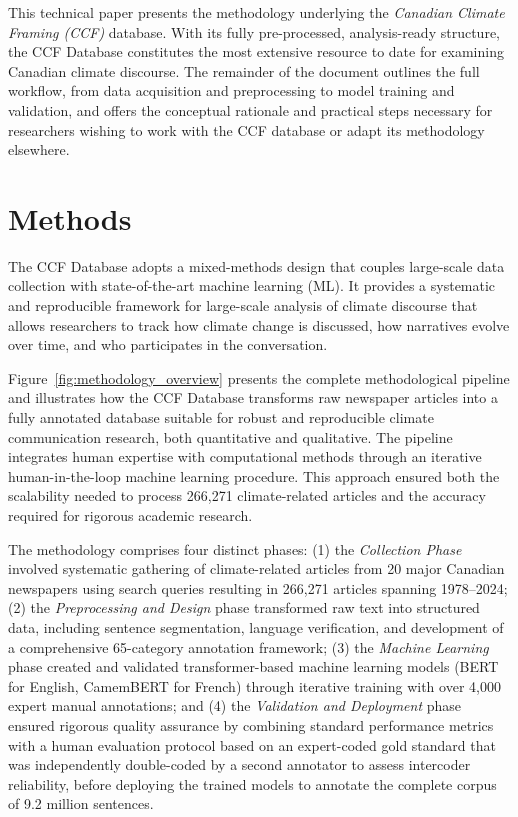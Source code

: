 \documentclass[12pt]{article}
\renewcommand\_{\texttt{\detokenize{_}\allowbreak}}
\begin{document}
This technical paper presents the methodology underlying the \emph{Canadian Climate Framing (CCF)} database. With its fully pre-processed, analysis-ready structure, the CCF Database constitutes the most extensive resource to date for examining Canadian climate discourse. The remainder of the document outlines the full workflow, from data acquisition and preprocessing to model training and validation, and offers the conceptual rationale and practical steps necessary for researchers wishing to work with the CCF database or adapt its methodology elsewhere.

\newpage

\section{Methods}

The CCF Database adopts a mixed-methods design that couples large-scale data collection with state-of-the-art machine learning (ML). It provides a systematic and reproducible framework for large-scale analysis of climate discourse that allows researchers to track how climate change is discussed, how narratives evolve over time, and who participates in the conversation.

Figure~\ref{fig:methodology_overview} presents the complete methodological pipeline and illustrates how the CCF Database transforms raw newspaper articles into a fully annotated database suitable for robust and reproducible climate communication research, both quantitative and qualitative. The pipeline integrates human expertise with computational methods through an iterative human-in-the-loop machine learning procedure. This approach ensured both the scalability needed to process 266,271 climate-related articles and the accuracy required for rigorous academic research.

The methodology comprises four distinct phases: (1) the \emph{Collection Phase} involved systematic gathering of climate-related articles from 20 major Canadian newspapers using search queries resulting in 266,271 articles spanning 1978–2024; (2) the \emph{Preprocessing and Design} phase transformed raw text into structured data, including sentence segmentation, language verification, and development of a comprehensive 65-category annotation framework; (3) the \emph{Machine Learning} phase created and validated transformer-based machine learning models (BERT for English, CamemBERT for French) through iterative training with over 4,000 expert manual annotations; and (4) the \emph{Validation and Deployment} phase ensured rigorous quality assurance by combining standard performance metrics with a human evaluation protocol based on an expert-coded gold standard that was independently double-coded by a second annotator to assess intercoder reliability, before deploying the trained models to annotate the complete corpus of 9.2 million sentences.
\end{document}
